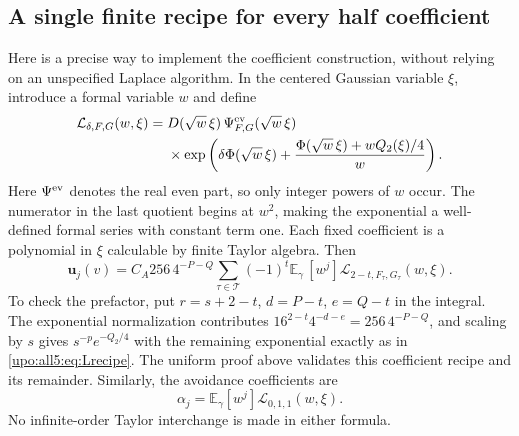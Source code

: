 \documentclass[11pt,letterpaper]{article}
\theoremstyle{remark}\newtheorem{remark}[theorem]{Remark}
\numberwithin{equation}{section}
\newcommand{\E}{\mathbb E}
\newcommand{\Tset}{\mathcal T}
\newcommand{\bfU}{\boldsymbol u}
\begin{document}
\subsection{A single finite recipe for every half coefficient}\label{upo:all5:sec:half-recipe}
Here is a precise way to implement the coefficient construction,
without relying on an unspecified Laplace algorithm. In the
centered Gaussian variable $\xi$, introduce a formal variable $w$
and define
\begin{align}\label{upo:all5:eq:Lrecipe}
 \mathcal L_{\delta,F,G}(w,\xi)
  ={}&D(\sqrt w\,\xi)\,\Psi^{\rm ev}_{F,G}(\sqrt w\,\xi)\notag\\
 &\times\exp\left(\delta\Phi(\sqrt w\,\xi)
       +\frac{\Phi(\sqrt w\,\xi)+wQ_2(\xi)/4}{w}\right).
\end{align}
Here $\Psi^{\rm ev}$ denotes the real even part, so only integer
powers of $w$ occur. The numerator in the last quotient begins at
$w^2$, making the exponential a well-defined formal series with
constant term one. Each fixed coefficient is a polynomial in
$\xi$ calculable by finite Taylor algebra. Then
\begin{equation}\label{upo:all5:eq:Urecipe}
 \bfU_j(v)=C_A256\,4^{-P-Q}
 \sum_{\tau\in\Tset}(-1)^t
      \E_\gamma\,[w^j]\mathcal L_{2-t,F_\tau,G_\tau}(w,\xi).
\end{equation}
To check the prefactor, put $r=s+2-t$, $d=P-t$, $e=Q-t$ in the
integral. The exponential normalization contributes
$16^{2-t}4^{-d-e}=256\,4^{-P-Q}$, and scaling by $s$ gives
$s^{-p}e^{-Q_2/4}$ with the remaining exponential exactly as in
\eqref{upo:all5:eq:Lrecipe}. The uniform proof above validates this coefficient
recipe and its remainder. Similarly, the avoidance coefficients are
\begin{equation}\label{upo:all5:eq:alpha-recipe}
 \alpha_j=\E_\gamma[w^j]\mathcal L_{0,1,1}(w,\xi).
\end{equation}
No infinite-order Taylor interchange is made in either formula.
\end{document}
